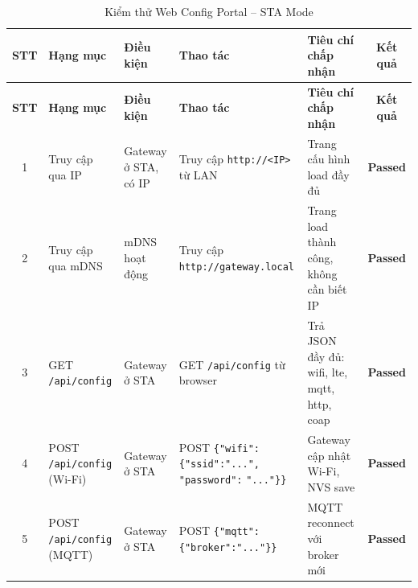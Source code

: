         \begin{longtable}{|c|p{}|p{}|p{}|p{}|c|}
            \caption{Kiểm thử Web Config Portal -- STA Mode}
            \label{tab:test_web_config_sta} \\
            \hline
            \textbf{STT} & \textbf{Hạng mục} & \textbf{Điều kiện} & \textbf{Thao tác} & \textbf{Tiêu chí chấp nhận} & \textbf{Kết quả} \\ \hline
            \endfirsthead
            \hline
            \textbf{STT} & \textbf{Hạng mục} & \textbf{Điều kiện} & \textbf{Thao tác} & \textbf{Tiêu chí chấp nhận} & \textbf{Kết quả} \\ \hline
            \endhead
            \hline
            \endfoot
            \endlastfoot
        
            1 & Truy cập qua IP & Gateway ở STA, có IP & Truy cập \texttt{http://<IP>} từ LAN & Trang cấu hình load đầy đủ & \textcolor{modern_blue}{\textbf{Passed}} \\ \hline
        
            2 & Truy cập qua mDNS & mDNS hoạt động & Truy cập \texttt{http://}\newline\texttt{gateway.local} & Trang load thành công, không cần biết IP & \textcolor{modern_blue}{\textbf{Passed}} \\ \hline
        
            3 & GET \texttt{/api/config} & Gateway ở STA & GET \texttt{/api/config} từ browser & Trả JSON đầy đủ: wifi, lte, mqtt, http, coap & \textcolor{modern_blue}{\textbf{Passed}} \\ \hline
        
            4 & POST \texttt{/api/config} (Wi-Fi) & Gateway ở STA & POST \texttt{\{"wifi":} \newline\texttt{\{"ssid":"...",} \newline\texttt{"password":} \newline \texttt{"..."\}\}} & Gateway cập nhật Wi-Fi, NVS save & \textcolor{modern_blue}{\textbf{Passed}} \\ \hline
        
            5 & POST \texttt{/api/config} (MQTT) & Gateway ở STA & POST \newline\texttt{\{"mqtt":} \newline\texttt{\{"broker":"..."\}\}} & MQTT reconnect với broker mới & \textcolor{modern_blue}{\textbf{Passed}} \\ \hline
        

\end{longtable}
